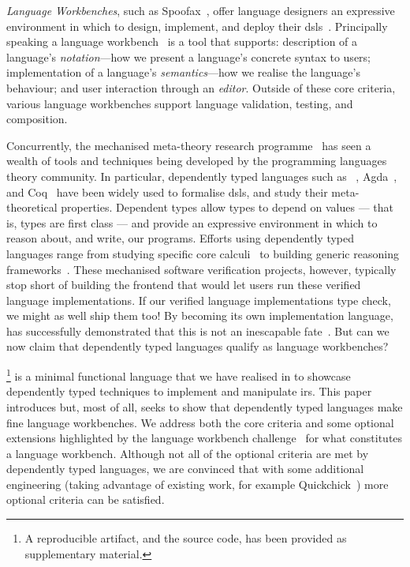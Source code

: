 \emph{Language Workbenches}, such as
Spoofax~\cite{DBLP:journals/software/WachsmuthKV14},
offer language designers an expressive environment in which to design,
implement, and deploy their \Acp{dsl}~\cite{hudak1996building}.
%
Principally speaking a language workbench~\cite{DBLP:conf/sle/ErdwegSVBBCGHKLKMPPSSSVVVWW13}
is a tool that supports:
description of a language's \emph{notation}---how we present a language's concrete syntax to users;
implementation of a language's \emph{semantics}---how we realise the language's behaviour;
and user interaction through an \emph{editor}.
%
Outside of these core criteria, various language workbenches
support language validation, testing, and composition.


Concurrently, the mechanised meta-theory research
programme~\cite{DBLP:conf/tphol/AydemirBFFPSVWWZ05,DBLP:journals/jfp/AbelAHPMSS19}
has seen a wealth of tools and techniques being developed
by the programming languages theory community.
%
In particular, dependently typed languages such as
\Idris{}~\cite{DBLP:conf/ecoop/Brady21},
Agda~\cite{DBLP:conf/afp/Norell08},
and Coq~\cite{the_coq_development_team_2022_5846982}
have been widely used to formalise \acp{dsl}, and study their
meta-theoretical properties.
%
Dependent types allow types to depend on values --- that is,
types are first class --- and provide an expressive environment
in which to reason about, and write, our programs.
%
Efforts using dependently typed languages range from
studying specific core calculi~\cite{10.1145/3093333.3009866,DBLP:conf/cpp/RouvoetPKV20,DBLP:conf/mpc/ChapmanKNW19}
to building generic reasoning frameworks~\cite{DBLP:conf/cpp/StarkSK19,DBLP:journals/jfp/AllaisACMM21}.
%
These mechanised software verification projects, however, typically stop short
of building the frontend that would let users run these verified
language implementations.
If our verified language implementations type check, we might as well ship them too!
%
By becoming its own implementation language, \Idris{} has successfully
demonstrated that this is not an inescapable fate~\cite{DBLP:conf/ecoop/Brady21}.
%
But can we now claim that dependently typed languages qualify as
language workbenches?

\Velo{}\footnote{A reproducible artifact, and the source code, has been provided as supplementary material.} is a minimal functional language that we have realised in \Idris{}
to showcase dependently typed techniques to implement and manipulate \acp{ir}.
%
This paper introduces \Velo{} but, most of all, seeks to show that
dependently typed languages make fine language workbenches.
%
We address both the core criteria and some optional extensions
highlighted by the language workbench challenge~\cite{DBLP:conf/sle/ErdwegSVBBCGHKLKMPPSSSVVVWW13} for what constitutes a language workbench.
%
%
Although not all of the optional criteria
are met by dependently typed languages, we are convinced that
with some additional engineering (taking advantage of existing work,
for example Quickchick~\cite{DBLP:journals/pacmpl/LampropoulosPP18})
more optional criteria can be satisfied.


